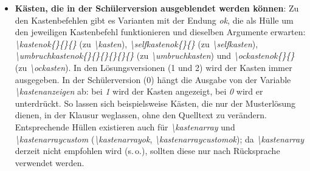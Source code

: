 \documentclass[../main.tex]{subfiles}
\begin{document}
\begin{itemize}
    Dabei enthalten die \textit{\textbackslash oc}-Befehle im 1. Argument die Nummer der Verbindung, im 2. Argument die Musterl\"osung (Punkte k\"onnen wahlweise in beiden Argumenten wie gewohnt mit \textit{\textbackslash punkte} eingef\"ugt werden) und im 3. Argument einen Inhalt f\"ur die Sch\"ulervariante (abgesehen von der Verbindungszahl). Es k\"onnen maximal 20 Inhalte definiert werden, die dann in selber Reihenfolge in den Teilk\"asten ausgegeben werden (bei jeder Teilaufgabe wird von vorne gez\"ahlt und innerhalb der Teilaufgabe wird zeilenweise gez\"ahlt). Jede Zeile wird mit \textit{\textbackslash ockasten} erstellt, wobei das 1. Argument das Breitenverh\"altnis der Teilk\"astchen angibt (es gibt derzeit: 1, 11, 12, 21, 111, 112, 121, 211, 1111; erweiterbar!) und das 2. Argument die H\"ohe der Teilk\"asten in dieser Zeile. Seitenumbr\"uche zwischen zwei Zeilen werden durch \textit{\hypertarget{ocumbruch}{\textbackslash ocumbruch}} gesetzt. \\Wichtig: Anders als bei \textit{\textbackslash kasten} wird bei \textit{\textbackslash ockasten} die H\"ohe ohne Einheit angegeben (es sind cm).
    \item \textbf{Kästen, die in der Schülerversion ausgeblendet werden können}: Zu den Kastenbefehlen gibt es Varianten mit der Endung \textit{ok}, die als Hülle um den jeweiligen Kastenbefehl funktionieren und dieselben Argumente erwarten: \textit{\hypertarget{kastenok}{\textbackslash kastenok\{\}\{\}\{\}}} (zu \textit{\textbackslash kasten}), \textit{\hypertarget{selfkastenok}{\textbackslash selfkastenok\{\}\{\}}} (zu \textit{\textbackslash selfkasten}), \textit{\hypertarget{umbruchkastenok}{\textbackslash umbruchkastenok\{\}\{\}\{\}\{\}\{\}\{\}}} (zu \textit{\textbackslash umbruchkasten}) und \textit{\hypertarget{ockastenok}{\textbackslash ockastenok\{\}\{\}}} (zu \textit{\textbackslash ockasten}). In den L\"osungsversionen (1 und 2) wird der Kasten immer ausgegeben. In der Sch\"ulerversion (0) h\"angt die Ausgabe von der Variable \textit{\textbackslash kastenanzeigen} ab: bei \textit{1} wird der Kasten angezeigt, bei \textit{0} wird er unterdr\"uckt. So lassen sich beispielsweise Kästen, die nur der Musterl\"osung dienen, in der Klausur weglassen, ohne den Quelltext zu ver\"andern. Entsprechende Hüllen existieren auch für \textit{\textbackslash kastenarray} und \textit{\textbackslash kastenarraycustom} (\textit{\textbackslash kastenarrayok}, \textit{\textbackslash kastenarraycustomok}); da \textit{\textbackslash kastenarray} derzeit nicht empfohlen wird (s.\,o.), sollten diese nur nach Rücksprache verwendet werden.
\end{itemize}
\end{document}
